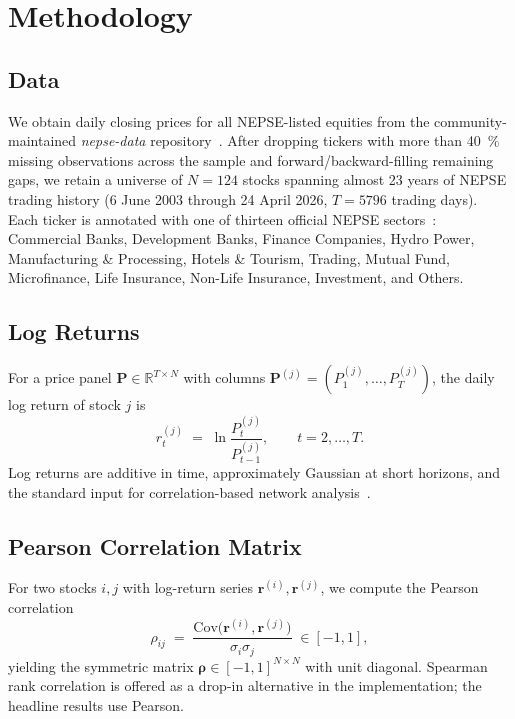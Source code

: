 \section{Methodology}
\label{sec:method}

\subsection{Data}
\label{sec:data}

We obtain daily closing prices for all NEPSE-listed equities from the
community-maintained \emph{nepse-data}
repository~\cite{nepse_data_repo}.  After dropping tickers with more
than \SI{40}{\percent} missing observations across the sample and
forward/backward-filling remaining gaps, we retain a universe of
$N=124$ stocks spanning almost 23 years of NEPSE trading history (6 June
2003 through 24 April 2026, $T=\num{5796}$ trading days).  Each
ticker is annotated with one of thirteen official NEPSE
sectors~\cite{neepse_website}: Commercial Banks, Development Banks,
Finance Companies, Hydro Power, Manufacturing \& Processing, Hotels
\& Tourism, Trading, Mutual Fund, Microfinance, Life Insurance,
Non-Life Insurance, Investment, and Others.

\subsection{Log Returns}
\label{sec:returns}

For a price panel $\bm{P}\in\mathbb{R}^{T\times N}$ with columns
$\bm{P}^{(j)}=(P_1^{(j)},\dots,P_T^{(j)})$, the daily log return of
stock $j$ is
\begin{equation}
  r_t^{(j)} \;=\; \ln\frac{P_t^{(j)}}{P_{t-1}^{(j)}},
  \qquad t=2,\dots,T.
  \label{eq:logret}
\end{equation}
Log returns are additive in time, approximately Gaussian at short
horizons, and the standard input for correlation-based network
analysis~\cite{mantegna1999introduction, cont2001empirical}.

\subsection{Pearson Correlation Matrix}
\label{sec:corr}

For two stocks $i,j$ with log-return series $\bm{r}^{(i)},\bm{r}^{(j)}$,
we compute the Pearson correlation
\begin{equation}
  \rho_{ij}
  \;=\;
  \frac{\text{Cov}\bigl(\bm{r}^{(i)},\bm{r}^{(j)}\bigr)}
       {\sigma_i \sigma_j}
  \;\in [-1, 1],
  \label{eq:pearson}
\end{equation}
yielding the symmetric matrix $\bm{\rho}\in[-1,1]^{N\times N}$ with
unit diagonal.  Spearman rank correlation is offered as a drop-in
alternative in the implementation; the headline results use Pearson.

